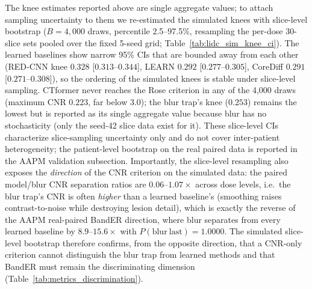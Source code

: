 \documentclass[twoside,11pt]{article}
\begin{document}
The knee estimates reported above are single aggregate values; to attach sampling uncertainty to them we re-estimated the simulated knees with slice-level bootstrap ($B=4{,}000$ draws, percentile 2.5--97.5\%, resampling the per-dose 30-slice sets pooled over the fixed 5-seed grid; Table~\ref{tab:lidc_sim_knee_ci}). The learned baselines show narrow 95\% CIs that are bounded away from each other (RED-CNN knee $0.328$ [$0.313$--$0.344$], LEARN $0.292$ [$0.277$--$0.305$], CoreDiff $0.291$ [$0.271$--$0.308$]), so the ordering of the simulated knees is stable under slice-level sampling. CTformer never reaches the Rose criterion in any of the 4{,}000 draws (maximum CNR $0.223$, far below $3.0$); the blur trap's knee ($0.253$) remains the lowest but is reported as its single aggregate value because blur has no stochasticity (only the seed-42 slice data exist for it). These slice-level CIs characterize slice-sampling uncertainty only and do not cover inter-patient heterogeneity; the patient-level bootstrap on the real paired data is reported in the AAPM validation subsection. Importantly, the slice-level resampling also exposes the \emph{direction} of the CNR criterion on the simulated data: the paired model/blur CNR separation ratios are $0.06$--$1.07\times$ across dose levels, i.e.\ the blur trap's CNR is often \emph{higher} than a learned baseline's (smoothing raises contrast-to-noise while destroying lesion detail), which is exactly the reverse of the AAPM real-paired BandER direction, where blur separates from every learned baseline by $8.9$--$15.6\times$ with $P(\mathrm{blur~last})=1.0000$. The simulated slice-level bootstrap therefore confirms, from the opposite direction, that a CNR-only criterion cannot distinguish the blur trap from learned methods and that BandER must remain the discriminating dimension (Table~\ref{tab:metrics_discrimination}).
\end{document}
